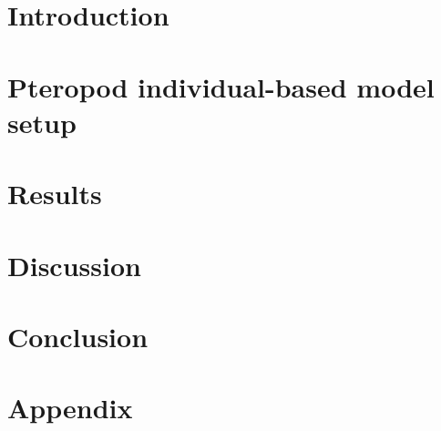 \documentclass[final,3p,times]{elsarticle}
\begin{document}



\section{Introduction}




\section{Pteropod individual-based model setup}



\section{Results}



\section{Discussion}


\section{Conclusion}


 \cleardoublepage
\onecolumn
\appendix
\section{Appendix}


\clearpage




\twocolumn









\end{document}

